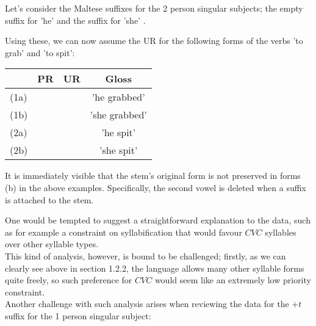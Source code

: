 \documentclass[11pt,draft]{article}
\begin{document}
Let's consider the Maltese suffixes for the 2 person singular subjects; the empty suffix \textipa{+\O} for 'he' and the suffix  for 'she' \cite{brame1974}.

Using these, we can now assume the UR for the following forms of the verbs  'to grab' and  'to spit':

\begin{table}[htdp]
\begin{tabularx}{400pt}{|l| C | C | C|}
	\hline
	&
	PR &
	UR &
	Gloss \\\hline\hline
	
	(1a) &
	 &
	 &
	'he grabbed' \\
	
	(1b) &
	 &
	 &
	'she grabbed' \\
	
	\hline
	
	(2a) &
	 &
	 &
	'he spit' \\
	
	(2b) &
	 &
	 &
	'she spit' \\
	
	\hline
	
\end{tabularx}
\end{table}

It is immediately visible that the stem's original form is not preserved in forms (b) in the above examples. Specifically, the second vowel is deleted when a suffix is attached to the stem.

One would be tempted to suggest a straightforward explanation to the data, such as for example a constraint on syllabification that would favour $CVC$ syllables over other syllable types.
\\

This kind of analysis, however, is bound to be challenged; firstly, as we can clearly see above in section 1.2.2, the language allows many other syllable forms quite freely, so such preference for $CVC$ would seem like an extremely low priority constraint.
\\

Another challenge with such analysis arises when reviewing the data for the $+t$ suffix for the 1 person singular subject:
\end{document}
